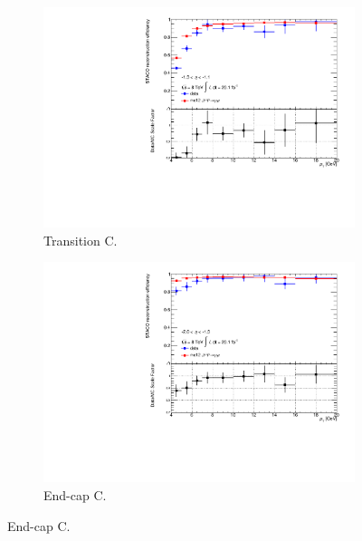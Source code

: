 \begin{figure}[htbp]
    \begin{subfigure}[b]{0.45\textwidth}
      \includegraphics[width=\textwidth]{PartCalibration2012/Plots/SFPlots/Transition_C_reco.pdf}
      \caption{Transition C.} \label{fig:CalibrationRecoSFTransitionC}
    \end{subfigure}
    \hfill
    \begin{subfigure}[b]{0.45\textwidth}
      \includegraphics[width=\textwidth]{PartCalibration2012/Plots/SFPlots/Endcap_C_reco.pdf}
      \caption{End-cap C.} \label{fig:CalibrationRecoSFEndcapC}
    \end{subfigure}


\end{figure}
